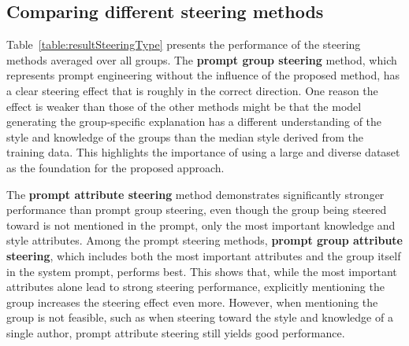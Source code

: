 \subsection{Comparing different steering methods}
\label{sec:evaluation:steering:methods}

Table~\ref{table:resultSteeringType} presents the performance of the steering methods averaged over all groups. The \textbf{prompt group steering} method, which represents prompt engineering without the influence of the proposed method, has a clear steering effect that is roughly in the correct direction. One reason the effect is weaker than those of the other methods might be that the model generating the group-specific explanation has a different understanding of the style and knowledge of the groups than the median style derived from the training data. This highlights the importance of using a large and diverse dataset as the foundation for the proposed approach.

\begin{table}[ht]
  \caption[]{This table shows the performance of different steering methods using the metrics displayed in Figure~\ref{fig:steeringMetrics}. The possible steering effect is not used in this experiment, because it is the same value of \num{10.4262} for all methods as the values are averages over all groups. The experiment demonstrates that mentioning the attributes in the system prompt improves steering performance significantly. %
    Additionally, the experiment demonstrates that the newly proposed activation-based steering methods (see Section~\ref{sec:approach:steering}) lead to a clear improvement over prompt engineering techniques.}%
  \label{table:resultSteeringType}
  \centering
  \resultSteeringType{}%
\end{table}

The \textbf{prompt attribute steering} method demonstrates significantly stronger performance than prompt group steering, even though the group being steered toward is not mentioned in the prompt, only the most important knowledge and style attributes. Among the prompt steering methods, \textbf{prompt group attribute steering}, which includes both the most important attributes and the group itself in the system prompt, performs best. This shows that, while the most important attributes alone lead to strong steering performance, explicitly mentioning the group increases the steering effect even more. However, when mentioning the group is not feasible, such as when steering toward the style and knowledge of a single author, prompt attribute steering still yields good performance.

